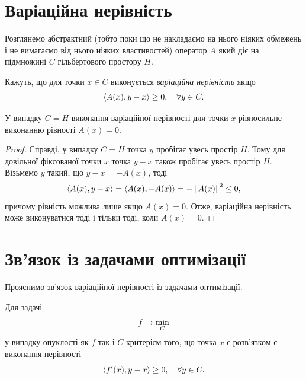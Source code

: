 \section{Варіаційна нерівність}

Розглянемо абстрактний (тобто поки що не накладаємо на нього ніяких обмежень і не вимагаємо від нього ніяких властивостей) оператор $A$ який діє на підмножині $C$ гільбертового простору $H$. 

\begin{definition}
    Кажуть, що для точки $x \in C$ виконується \emph{варіаційна нерівність} якщо
    \begin{equation}
        \sp{A(x), y - x} \ge 0, \quad \forall y \in C.
    \end{equation}
\end{definition}

\begin{proposition}
    У випадку $C = H$ виконання варіаційної нерівності для точки $x$ рівносильне виконанню рівності $A(x) = 0$.
\end{proposition}

\begin{proof}
    Справді, у випадку $C = H$ точка $y$ пробігає увесь простір $H$. Тому для довільної фіксованої точки $x$ точка $y - x$ також пробігає увесь простір $H$. Візьмемо $y$ такий, що $y - x = -A(x)$, тоді 
    \begin{equation}
        \sp{A(x), y - x} = \sp{A(x), -A(x)} = - \no{A(x)}^2 \le 0,
    \end{equation}
    причому рівність можлива лише якщо $A(x) = 0$. Отже, варіаційна нерівність може виконуватися тоді і тільки тоді, коли $A(x) = 0$.
\end{proof}

\section{Зв'язок із задачами оптимізації}

Прояснимо зв'язок варіаційної нерівності із задачами оптимізації. \medskip

\begin{proposition}
    Для задачі
    \begin{equation}
        f \to \Min_C
    \end{equation}
    у випадку опуклості як $f$ так і $C$ критерієм того, що точка $x$ є розв'язком є виконання нерівності
    \begin{equation}
        \sp{f'(x), y - x} \ge 0, \quad \forall y \in C.
    \end{equation}
\end{proposition}


